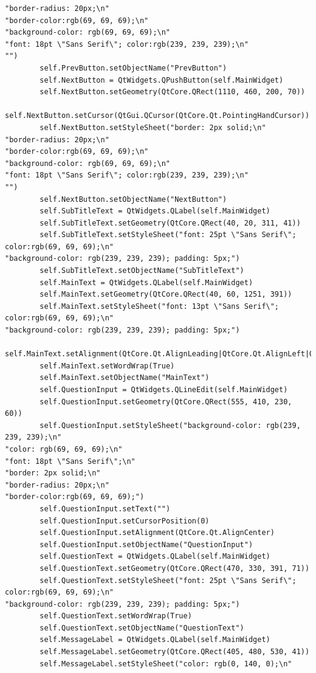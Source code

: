 \documentclass[12pt]{article}
\begin{document}
\begin{lstlisting}
"border-radius: 20px;\n"
"border-color:rgb(69, 69, 69);\n"
"background-color: rgb(69, 69, 69);\n"
"font: 18pt \"Sans Serif\"; color:rgb(239, 239, 239);\n"
"")
        self.PrevButton.setObjectName("PrevButton")
        self.NextButton = QtWidgets.QPushButton(self.MainWidget)
        self.NextButton.setGeometry(QtCore.QRect(1110, 460, 200, 70))
        self.NextButton.setCursor(QtGui.QCursor(QtCore.Qt.PointingHandCursor))
        self.NextButton.setStyleSheet("border: 2px solid;\n"
"border-radius: 20px;\n"
"border-color:rgb(69, 69, 69);\n"
"background-color: rgb(69, 69, 69);\n"
"font: 18pt \"Sans Serif\"; color:rgb(239, 239, 239);\n"
"")
        self.NextButton.setObjectName("NextButton")
        self.SubTitleText = QtWidgets.QLabel(self.MainWidget)
        self.SubTitleText.setGeometry(QtCore.QRect(40, 20, 311, 41))
        self.SubTitleText.setStyleSheet("font: 25pt \"Sans Serif\"; color:rgb(69, 69, 69);\n"
"background-color: rgb(239, 239, 239); padding: 5px;")
        self.SubTitleText.setObjectName("SubTitleText")
        self.MainText = QtWidgets.QLabel(self.MainWidget)
        self.MainText.setGeometry(QtCore.QRect(40, 60, 1251, 391))
        self.MainText.setStyleSheet("font: 13pt \"Sans Serif\"; color:rgb(69, 69, 69);\n"
"background-color: rgb(239, 239, 239); padding: 5px;")
        self.MainText.setAlignment(QtCore.Qt.AlignLeading|QtCore.Qt.AlignLeft|QtCore.Qt.AlignTop)
        self.MainText.setWordWrap(True)
        self.MainText.setObjectName("MainText")
        self.QuestionInput = QtWidgets.QLineEdit(self.MainWidget)
        self.QuestionInput.setGeometry(QtCore.QRect(555, 410, 230, 60))
        self.QuestionInput.setStyleSheet("background-color: rgb(239, 239, 239);\n"
"color: rgb(69, 69, 69);\n"
"font: 18pt \"Sans Serif\";\n"
"border: 2px solid;\n"
"border-radius: 20px;\n"
"border-color:rgb(69, 69, 69);")
        self.QuestionInput.setText("")
        self.QuestionInput.setCursorPosition(0)
        self.QuestionInput.setAlignment(QtCore.Qt.AlignCenter)
        self.QuestionInput.setObjectName("QuestionInput")
        self.QuestionText = QtWidgets.QLabel(self.MainWidget)
        self.QuestionText.setGeometry(QtCore.QRect(470, 330, 391, 71))
        self.QuestionText.setStyleSheet("font: 25pt \"Sans Serif\"; color:rgb(69, 69, 69);\n"
"background-color: rgb(239, 239, 239); padding: 5px;")
        self.QuestionText.setWordWrap(True)
        self.QuestionText.setObjectName("QuestionText")
        self.MessageLabel = QtWidgets.QLabel(self.MainWidget)
        self.MessageLabel.setGeometry(QtCore.QRect(405, 480, 530, 41))
        self.MessageLabel.setStyleSheet("color: rgb(0, 140, 0);\n"

\end{lstlisting}
\end{document}
